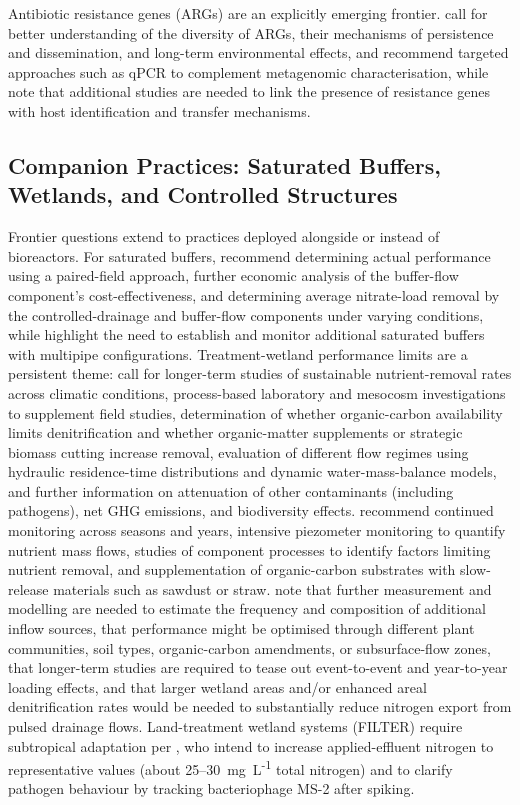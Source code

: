 \documentclass[11pt]{article}
\begin{document}
Antibiotic resistance genes (ARGs) are an explicitly emerging frontier. \textcite{Smith2019b} call for better understanding of the diversity of ARGs, their mechanisms of persistence and dissemination, and long-term environmental effects, and recommend targeted approaches such as qPCR to complement metagenomic characterisation, while \textcite{Rieke2018} note that additional studies are needed to link the presence of resistance genes with host identification and transfer mechanisms.

\subsection{Companion Practices: Saturated Buffers, Wetlands, and Controlled Structures}
Frontier questions extend to practices deployed alongside or instead of bioreactors. For saturated buffers, \textcite{Ghane2025} recommend determining actual performance using a paired-field approach, further economic analysis of the buffer-flow component's cost-effectiveness, and determining average nitrate-load removal by the controlled-drainage and buffer-flow components under varying conditions, while \textcite{Jaynes2019b} highlight the need to establish and monitor additional saturated buffers with multipipe configurations. Treatment-wetland performance limits are a persistent theme: \textcite{Tanner2005} call for longer-term studies of sustainable nutrient-removal rates across climatic conditions, process-based laboratory and mesocosm investigations to supplement field studies, determination of whether organic-carbon availability limits denitrification and whether organic-matter supplements or strategic biomass cutting increase removal, evaluation of different flow regimes using hydraulic residence-time distributions and dynamic water-mass-balance models, and further information on attenuation of other contaminants (including pathogens), net GHG emissions, and biodiversity effects. \textcite{Tanner2003} recommend continued monitoring across seasons and years, intensive piezometer monitoring to quantify nutrient mass flows, studies of component processes to identify factors limiting nutrient removal, and supplementation of organic-carbon substrates with slow-release materials such as sawdust or straw. \textcite{Tanner2005b} note that further measurement and modelling are needed to estimate the frequency and composition of additional inflow sources, that performance might be optimised through different plant communities, soil types, organic-carbon amendments, or subsurface-flow zones, that longer-term studies are required to tease out event-to-event and year-to-year loading effects, and that larger wetland areas and/or enhanced areal denitrification rates would be needed to substantially reduce nitrogen export from pulsed drainage flows. Land-treatment wetland systems (FILTER) require subtropical adaptation per \textcite{Gardner2001}, who intend to increase applied-effluent nitrogen to representative values (about 25--30~mg~L\textsuperscript{-1} total nitrogen) and to clarify pathogen behaviour by tracking bacteriophage MS-2 after spiking.
\end{document}
